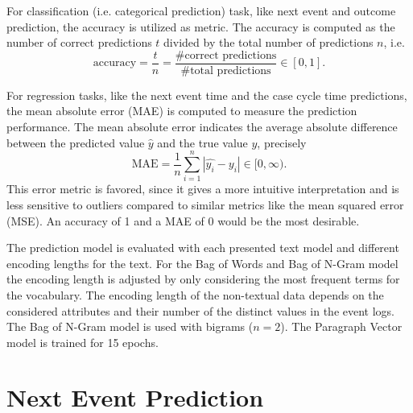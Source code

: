 For classification (i.e. categorical prediction) task, like next event and outcome prediction, the accuracy is utilized as metric.
The accuracy is computed as the number of correct predictions $t$ divided by the total number of predictions $n$, i.e. 
\begin{equation*}
	\textrm{accuracy} = \dfrac{t}{n} = \dfrac{\textrm{\# correct predictions}}{\textrm{\# total predictions}} \in [0,1].
\end{equation*}

For regression tasks, like the next event time and the case cycle time predictions, the mean absolute error (MAE) is computed to measure the prediction performance. The mean absolute error indicates the average absolute difference between the predicted value $\hat{y}$ and the true value $y$,  precisely
\begin{equation*}
	\textrm{MAE} = \dfrac{1}{n}\sum_{i=1}^{n}|\hat{y_i} - y_i| \in [0, \infty).
\end{equation*}
This error metric is favored, since it gives a more intuitive interpretation and is less sensitive to outliers compared to similar metrics like the mean squared error (MSE).
An accuracy of 1 and a MAE of 0 would be the most desirable.

The prediction model is evaluated with each presented text model and different encoding lengths for the text.
For the Bag of Words and Bag of N-Gram model the encoding length is adjusted by only considering the most frequent terms for the vocabulary.
The encoding length of the non-textual data depends on the considered attributes and their number of the distinct values in the event logs.
The Bag of N-Gram model is used with bigrams ($n=2$).
The Paragraph Vector model is trained for 15 epochs.

\section{Next Event Prediction}

